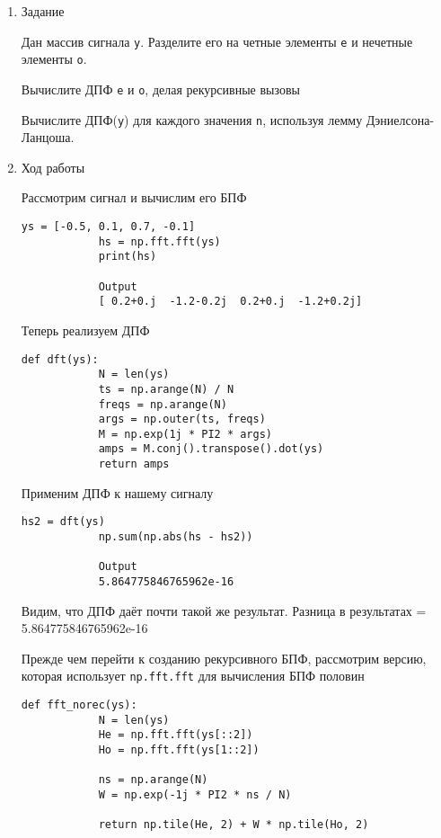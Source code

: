\documentclass[a4paper,12pt]{article}
\begin{document}
	\begin{enumerate}
		
		\item{Задание}
		
		Дан массив сигнала \texttt{y}. Разделите его на четные элементы \texttt{e} и нечетные элементы \texttt{o}.
		
		Вычислите ДПФ \texttt{e} и \texttt{о}, делая рекурсивные вызовы
		
		Вычислите ДПФ(\texttt{y}) для каждого значения \texttt{n}, используя лемму Дэниелсона-Ланцоша.
		
		\item{Ход работы}
		
		
		Рассмотрим сигнал и вычислим его БПФ
		
		\begin{lstlisting}[caption=БПФ сигнала]
			ys = [-0.5, 0.1, 0.7, -0.1]
			hs = np.fft.fft(ys)
			print(hs)
			
			Output
			[ 0.2+0.j  -1.2-0.2j  0.2+0.j  -1.2+0.2j]
		\end{lstlisting}
	
		Теперь реализуем ДПФ
		\begin{lstlisting}[caption=ДПФ]
			def dft(ys):
			N = len(ys)
			ts = np.arange(N) / N
			freqs = np.arange(N)
			args = np.outer(ts, freqs)
			M = np.exp(1j * PI2 * args)
			amps = M.conj().transpose().dot(ys)
			return amps
		\end{lstlisting}
		
		Применим ДПФ к нашему сигналу
		\begin{lstlisting}[caption=Применение ДПФ]
			hs2 = dft(ys)
			np.sum(np.abs(hs - hs2))
			
			Output
			5.864775846765962e-16
		\end{lstlisting}
	
		Видим, что ДПФ даёт почти такой же результат. Разница в результатах = 5.864775846765962e-16
		
		Прежде чем перейти к созданию рекурсивного БПФ, рассмотрим версию, которая использует \texttt{np.fft.fft} для вычисления БПФ половин
		\begin{lstlisting}[caption=Вычисление БПФ половин]
			def fft_norec(ys):
			N = len(ys)
			He = np.fft.fft(ys[::2])
			Ho = np.fft.fft(ys[1::2])
			
			ns = np.arange(N)
			W = np.exp(-1j * PI2 * ns / N)
			
			return np.tile(He, 2) + W * np.tile(Ho, 2)
		\end{lstlisting}
		

\end{enumerate}
\end{document}
